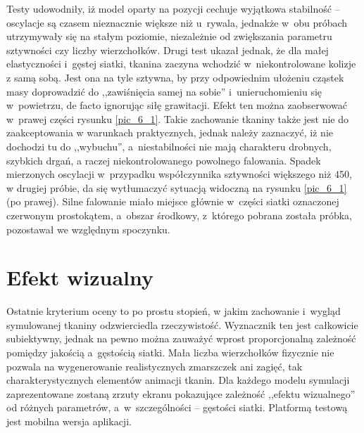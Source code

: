 		Testy udowodniły, iż model oparty na pozycji cechuje wyjątkowa stabilność -- oscylacje są czasem nieznacznie większe niż u~rywala, jednakże w~obu próbach utrzymywały się na stałym poziomie, niezależnie od zwiększania parametru sztywności czy liczby wierzchołków. Drugi test ukazał jednak, że dla małej elastyczności i~gęstej siatki, tkanina zaczyna wchodzić w~niekontrolowane kolizje z samą sobą. Jest ona na tyle sztywna, by przy odpowiednim ułożeniu cząstek masy doprowadzić do ,,zawiśnięcia samej na sobie'' i~unieruchomieniu się w~powietrzu, de facto ignorując siłę grawitacji. Efekt ten można zaobserwować w~prawej części rysunku \ref{pic_6_1}. Takie zachowanie tkaniny także jest nie do zaakceptowania w warunkach praktycznych, jednak należy zaznaczyć, iż nie dochodzi tu do ,,wybuchu'', a~niestabilności nie mają charakteru drobnych, szybkich drgań, a raczej niekontrolowanego powolnego falowania. Spadek mierzonych oscylacji w~przypadku współczynnika sztywności większego niż 450, w drugiej próbie, da się wytłumaczyć sytuacją widoczną na rysunku \ref{pic_6_1} (po prawej). Silne falowanie miało miejsce głównie w~części siatki oznaczonej czerwonym prostokątem, a~obszar środkowy, z~którego pobrana została próbka, pozostawał we względnym spoczynku.
		
		
		
		
		
	\section{Efekt wizualny}
	\label{t:wyniki:efektwiz}
		
		Ostatnie kryterium oceny to po prostu stopień, w jakim zachowanie i~wygląd symulowanej tkaniny odzwierciedla rzeczywistość. Wyznacznik ten jest całkowicie subiektywny, jednak na pewno można zauważyć wprost proporcjonalną zależność pomiędzy jakością a~gęstością siatki. Mała liczba wierzchołków fizycznie nie pozwala na wygenerowanie realistycznych zmarszczek ani zagięć, tak charakterystycznych elementów animacji tkanin. Dla każdego modelu symulacji zaprezentowane zostaną zrzuty ekranu pokazujące zależność ,,efektu wizualnego'' od różnych parametrów, a~w~szczególności -- gęstości siatki. Platformą testową jest mobilna wersja aplikacji.
		
